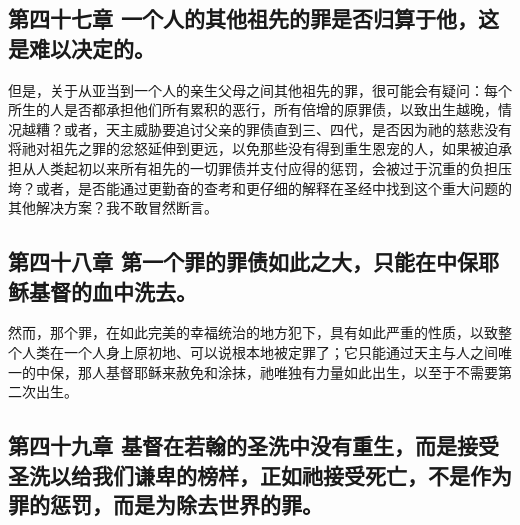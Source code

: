 
\subsection{第四十七章  一个人的其他祖先的罪是否归算于他，这是难以决定的。}

但是，关于从亚当到一个人的亲生父母之间其他祖先的罪，很可能会有疑问：每个所生的人是否都承担他们所有累积的恶行，所有倍增的原罪债，以致出生越晚，情况越糟？或者，天主威胁要追讨父亲的罪债直到三、四代，是否因为祂的慈悲没有将祂对祖先之罪的忿怒延伸到更远，以免那些没有得到重生恩宠的人，如果被迫承担从人类起初以来所有祖先的一切罪债并支付应得的惩罚，会被过于沉重的负担压垮？或者，是否能通过更勤奋的查考和更仔细的解释在圣经中找到这个重大问题的其他解决方案？我不敢冒然断言。\par


\subsection{第四十八章  第一个罪的罪债如此之大，只能在中保耶稣基督的血中洗去。}

然而，那个罪，在如此完美的幸福统治的地方犯下，具有如此严重的性质，以致整个人类在一个人身上原初地、可以说根本地被定罪了；它只能通过天主与人之间唯一的中保，那人基督耶稣来赦免和涂抹，祂唯独有力量如此出生，以至于不需要第二次出生。\par


\subsection{第四十九章  基督在若翰的圣洗中没有重生，而是接受圣洗以给我们谦卑的榜样，正如祂接受死亡，不是作为罪的惩罚，而是为除去世界的罪。}

